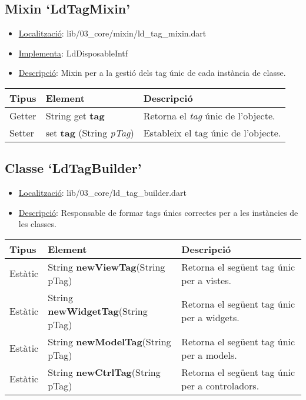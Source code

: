 \documentclass{article}
\begin{document}
\subsection{Mixin `LdTagMixin'}
\begin{itemize}
    \item \underline{Localització}: lib/03\_core/mixin/ld\_tag\_mixin.dart
    \item \underline{Implementa}: LdDisposableIntf
    \item \underline{Descripció}: Mixin per a la gestió dels tag únic de cada instància de classe.
\end{itemize}

\begin{longtable}{@{}L{1.25cm}L{4.5cm}L{8.75cm}@{}}
\toprule
\textbf{Tipus} & \textbf{Element} & \textbf{Descripció} \\
\midrule
Getter & String get \textbf{tag} & Retorna el \textit{tag} únic de l'objecte. \\
Setter & set \textbf{tag} (String \textit{pTag}) & Estableix el tag únic de l'objecte. \\
\bottomrule
\end{longtable}

\subsection{Classe `LdTagBuilder'}
\begin{itemize}
    \item \underline{Localització}: lib/03\_core/ld\_tag\_builder.dart
    \item \underline{Descripció}: Responsable de formar tags únics correctes per a les instàncies de les classes.
\end{itemize}

\begin{longtable}[H]
\begin{tabular}{@{}L{1.25cm}L{4.5cm}L{8.75cm}@{}}
\toprule
\textbf{Tipus} & \textbf{Element} & \textbf{Descripció} \\
\midrule
Estàtic & String \textbf{newViewTag}(String pTag) & Retorna el següent tag únic per a vistes. \\
Estàtic & String \textbf{newWidgetTag}(String pTag) & Retorna el següent tag únic per a widgets. \\
Estàtic & String \textbf{newModelTag}(String pTag) & Retorna el següent tag únic per a models. \\
Estàtic & String \textbf{newCtrlTag}(String pTag) & Retorna el següent tag únic per a controladors. \\
\bottomrule
\end{tabular}
\end{longtable}
\end{document}
